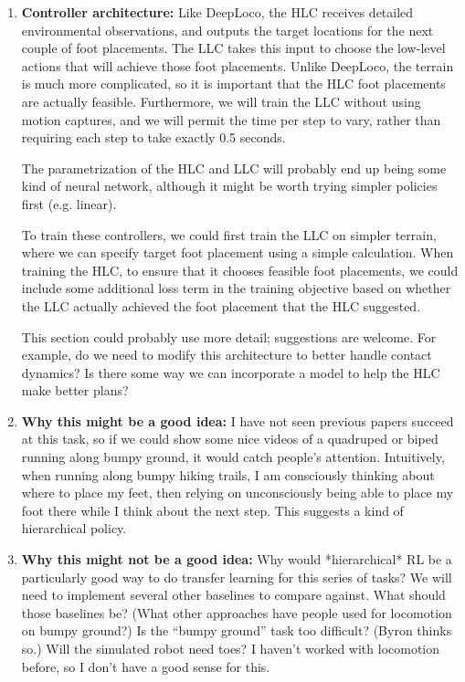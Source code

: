 \documentclass[a4paper]{article}
\newcommand{\highlight}[1]{{\leavevmode\color{blue} #1}}
\begin{document}
\begin{enumerate}
\item \textbf{Controller architecture:}
  Like DeepLoco, the HLC receives detailed environmental observations, and outputs the target locations for the next couple of foot placements.
  The LLC takes this input to choose the low-level actions that will achieve those foot placements.
  Unlike DeepLoco, the terrain is much more complicated, so it is important that the HLC foot placements are actually feasible.
  Furthermore, we will train the LLC without using motion captures, and we will permit the time per step to vary, rather than requiring each step to take exactly 0.5 seconds.

  The parametrization of the HLC and LLC will probably end up being some kind of neural network, although it might be worth trying simpler policies first (e.g. linear).

  To train these controllers, we could first train the LLC on simpler terrain, where we can specify target foot placement using a simple calculation.
  When training the HLC, to ensure that it chooses feasible foot placements, we could include some additional loss term in the training objective based on whether the LLC actually achieved the foot placement that the HLC suggested.

\highlight{This section could probably use more detail; suggestions are welcome.
For example, do we need to modify this architecture to better handle contact dynamics?
Is there some way we can incorporate a model to help the HLC make better plans?}

\item \textbf{Why this might be a good idea:}
I have not seen previous papers succeed at this task, so if we could show some nice videos of a quadruped or biped running along bumpy ground, it would catch people's attention.
Intuitively, when running along bumpy hiking trails, I am consciously thinking about where to place my feet, then relying on unconsciously being able to place my foot there while I think about the next step.
This suggests a kind of hierarchical policy.

\item \textbf{Why this might not be a good idea:}
  \highlight{Why would *hierarchical* RL be a particularly good way to do transfer learning for this series of tasks?}
  We will need to implement several other baselines to compare against.
  \highlight{What should those baselines be? (What other approaches have people used for locomotion on bumpy ground?)
Is the ``bumpy ground'' task too difficult? (Byron thinks so.)
Will the simulated robot need toes?}
I haven't worked with locomotion before, so I don't have a good sense for this.

\end{enumerate}




\end{document}
